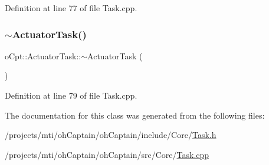 Definition at line 77 of file Task.\+cpp.

\hypertarget{classo_cpt_1_1_actuator_task_a829531567f8c0e660d2f4b541623915d}{}\label{classo_cpt_1_1_actuator_task_a829531567f8c0e660d2f4b541623915d} 
\subsubsection{\texorpdfstring{$\sim$\+Actuator\+Task()}{~ActuatorTask()}}
{\footnotesize\ttfamily o\+Cpt\+::\+Actuator\+Task\+::$\sim$\+Actuator\+Task (\begin{DoxyParamCaption}{ }\end{DoxyParamCaption})\hspace{0.3cm}{\ttfamily [virtual]}}



Definition at line 79 of file Task.\+cpp.



The documentation for this class was generated from the following files\+:\begin{DoxyCompactItemize}
\item 
/projects/mti/oh\+Captain/oh\+Captain/include/\+Core/\hyperlink{_task_8h}{Task.\+h}\item 
/projects/mti/oh\+Captain/oh\+Captain/src/\+Core/\hyperlink{_task_8cpp}{Task.\+cpp}\end{DoxyCompactItemize}
